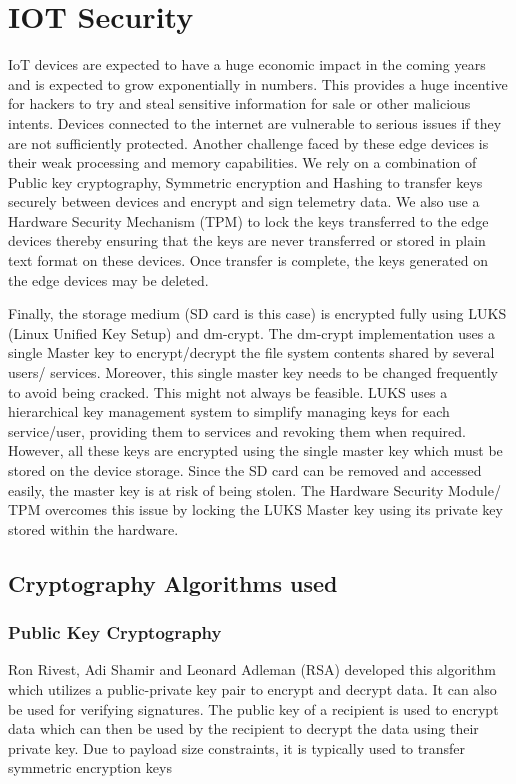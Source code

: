 \documentclass[11pt,openright]{report}
\begin{document}
\section{IOT Security}
IoT devices are expected to have a huge economic impact in the coming years and is expected to grow exponentially in numbers. This provides a huge incentive for hackers to try and steal sensitive information for sale or other malicious intents. Devices connected to the internet are vulnerable to serious issues if they are not sufficiently protected. Another challenge faced by these edge devices is their weak processing and memory capabilities. We rely on a combination of Public key cryptography, Symmetric encryption and Hashing to transfer keys securely between devices and encrypt and sign telemetry data. We also use a Hardware Security Mechanism (TPM) to lock the keys transferred to the edge devices thereby ensuring that the keys are never transferred or stored in plain text format on these devices. Once transfer is complete, the keys generated on the edge devices may be deleted.

Finally, the storage medium (SD card is this case) is encrypted fully using LUKS (Linux Unified Key Setup) and dm-crypt. The dm-crypt implementation uses a single Master key to encrypt/decrypt the file system contents shared by several users/ services. Moreover, this single master key needs to be changed frequently to avoid being cracked. This might not always be feasible. LUKS uses a hierarchical key management system to simplify managing keys for each service/user, providing them to services and revoking them when required. However, all these keys are encrypted using the single master key which must be stored on the device storage. Since the SD card can be removed and accessed easily, the master key is at risk of being stolen. The Hardware Security Module/ TPM overcomes this issue by locking the LUKS Master key using its private key stored within the hardware.

\subsection{Cryptography Algorithms used}
\subsubsection{Public Key Cryptography}
Ron Rivest, Adi Shamir and Leonard Adleman (RSA) developed this algorithm which utilizes a public-private key pair to encrypt and decrypt data. It can also be used for verifying signatures. The public key of a recipient is used to encrypt data which can then be used by the recipient to decrypt the data using their private key. Due to payload size constraints, it is typically used to transfer symmetric encryption keys
\end{document}
